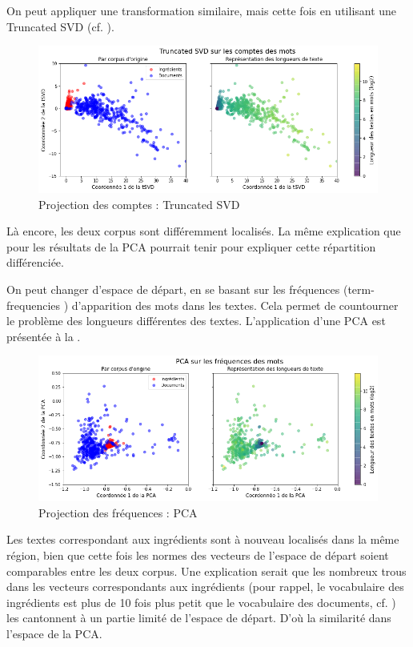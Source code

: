             On peut appliquer une transformation similaire, mais cette fois en utilisant une Truncated SVD (cf. ).
            \begin{figure}[htbp]
                \begin{center}
                \includegraphics[width=0.9\linewidth]{img/tSVD_counts.png}
                \end{center}
                \caption{Projection des comptes : Truncated SVD}
                \label{fig:tSVD_counts}
            \end{figure}
            Là encore, les deux corpus sont différemment localisés.
            La même explication que pour les résultats de la PCA pourrait tenir pour expliquer cette répartition différenciée.

            On peut changer d'espace de départ, en se basant sur les fréquences (\og term-frequencies \fg) d'apparition des mots dans les textes. 
            Cela permet de countourner le problème des longueurs différentes des textes.
            L'application d'une PCA est présentée à la .
            \begin{figure}[htbp]
                \begin{center}
                \includegraphics[width=0.9\linewidth]{img/PCA_freq.png}
                \end{center}
                \caption{Projection des fréquences : PCA}
                \label{fig:PCA_freq}
            \end{figure}
            Les textes correspondant aux ingrédients sont à nouveau localisés dans la même région, bien que cette fois les normes des vecteurs de l'espace de départ soient comparables entre les deux corpus.
            Une explication serait que les nombreux \og trous \fg dans les vecteurs correspondants aux ingrédients (pour rappel, le vocabulaire des ingrédients est plus de 10 fois plus petit que le vocabulaire des documents, cf. ) les cantonnent à un partie limité de l'espace de départ.
            D'où la similarité dans l'espace de la PCA.


